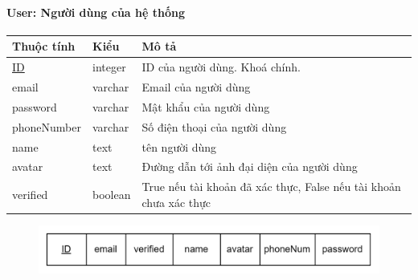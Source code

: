 \paragraph{User: Người dùng của hệ thống}
\begin{center}
\begin{tabular}{|p{3cm} |p{2cm} |p{9cm}|}
 \hline
    Thuộc tính & Kiểu & Mô tả \\ [0.5ex] 
 \hline
 \underline{ID} & integer & ID của người dùng. Khoá chính. \\ 
 \hline
 email & varchar & Email của người dùng \\
 \hline
 password & varchar & Mật khẩu của người dùng \\
 \hline
 phoneNumber & varchar & Số điện thoại của người dùng \\
 \hline
 name & text & tên người dùng \\ [1ex] 
 \hline
 avatar & text & Đường dẫn tới ảnh đại diện của người dùng \\
 \hline
 verified & boolean & True nếu tài khoản đã xác thực, False nếu tài khoản chưa xác thực \\
 \hline
\end{tabular}
\end{center}
\begin{figure}[h]
        \centering
        \includegraphics[width=\textwidth]{Content//Phân tích và thiết kế hệ thống//images//ERD_mapping/user_mapping.png}
        \label{fig:enter-label}
\end{figure}
